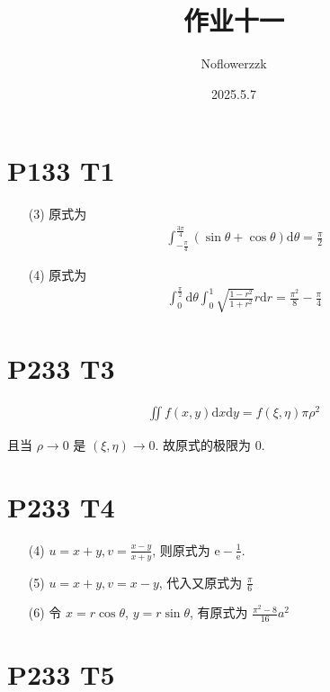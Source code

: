 \documentclass{article}
\title{作业十一}
\author{Noflowerzzk}
\date{2025.5.7}
\newcommand{\dd}{\mathrm{d}}
\begin{document}
\maketitle

\section*{P133 T1}

\begin{itemize}
    \item [(3)] 原式为
    \begin{align*}
        \int_{-\frac{\pi}{4}}^{\frac{3\pi}{4}}(\sin \theta + \cos \theta)\dd \theta = \frac{\pi}{2}
    \end{align*}
    \item [(4)] 原式为
    \begin{align*}
        \int_{0}^{\frac{\pi}{2}}\dd \theta \int_{0}^{1}\sqrt{\frac{1 - r^2}{1 + r^2}}r \dd r = \frac{\pi^2}{8} - \frac{\pi}{4}
    \end{align*}
\end{itemize}

\section*{P233 T3}

\begin{align*}
    \iint f(x, y) \dd x \dd y = f(\xi, \eta)\pi \rho^2
\end{align*}

且当 $\rho \to 0$ 是 $(\xi, \eta) \to 0$. 故原式的极限为 0.

\section*{P233 T4}

\begin{itemize}
    \item [(4)]
    $u = x + y, v = \frac{x - y}{x + y}$, 则原式为 $\mathrm{e} - \frac{1}{\mathrm{e}}$.
    \item [(5)] $u = x + y, v = x - y$, 代入又原式为 $\frac{\pi}{6}$
    \item [(6)] 令 $x = r\cos \theta$, $y = r\sin \theta$, 有原式为 $\frac{\pi^2 - 8}{16}a^2$
\end{itemize}

\section*{P233 T5}
\end{document}
